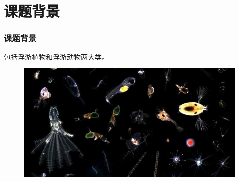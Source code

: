 \documentclass[notheorems,mathserif,table,compress]{beamer}  %
\begin{document}
\section{课题背景}

\begin{frame}
\frametitle{课题背景}
包括{\color{blue}浮游植物}和{\color{blue}浮游动物}两大类。

\begin{figure}
\includegraphics[width=0.8\linewidth]{zooplankton}
\end{figure}


~\\

\end{frame}
\end{document}
